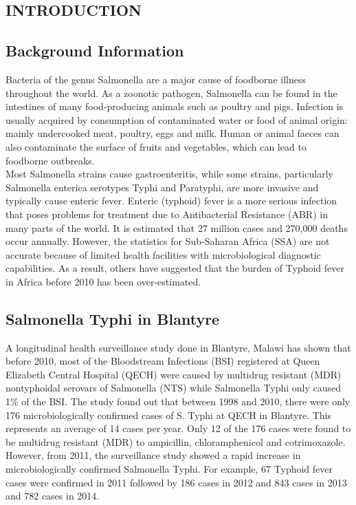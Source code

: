 \documentclass[a4paper]{thesis}
\begin{document}
\begin{center}
\chapter{INTRODUCTION}
\end{center} 


\section{Background Information}

Bacteria of the genus Salmonella are a major cause of foodborne illness throughout the world. As a zoonotic pathogen, Salmonella can be found in the intestines of many food-producing animals such as poultry and pigs. Infection is usually acquired by consumption of contaminated water or food of animal origin: mainly undercooked meat, poultry, eggs and milk. Human or animal faeces can also contaminate the surface of fruits and vegetables, which can lead to foodborne outbreaks.\cite{WHO} \\

Most Salmonella strains cause gastroenteritis, while some strains, particularly Salmonella enterica serotypes Typhi and Paratyphi, are more invasive and typically cause enteric fever. Enteric (typhoid) fever is a more serious infection that poses problems for treatment due to Antibacterial Resistance (ABR) in many parts of the world. It is estimated that 27 million cases and 270,000 deaths occur annually.\cite{Buckle} However, the statistics for Sub-Saharan Africa (SSA) are not accurate because of limited health facilities with microbiological diagnostic capabilities. \cite{Peters} As a result, others have suggested that the burden of Typhoid fever in Africa before 2010 has been over-estimated. \cite{Mweu}

\section{Salmonella Typhi in Blantyre}

A longitudinal health surveillance study done in Blantyre, Malawi has shown that before 2010, most of the Bloodstream Infections (BSI) registered at Queen Elizabeth Central Hospital (QECH) were caused by multidrug resistant (MDR) nontyphoidal serovars of Salmonella (NTS) while Salmonella Typhi only caused 1\% of the BSI.\cite{Gordon} The study found out that between 1998 and 2010, there were only 176 microbiologically confirmed cases of S. Typhi at QECH in Blantyre. This represents an average of 14 cases per year. Only 12 of the 176 cases were found to be multidrug resistant (MDR) to ampicillin, chloramphenicol and cotrimoxazole. However, from 2011, the surveillance study showed a rapid increase in microbiologically confirmed Salmonella Typhi. For example, 67 Typhoid fever cases were confirmed in 2011 followed by 186 cases in 2012 and 843 cases in 2013 and 782 cases in 2014.\\
\end{document}
